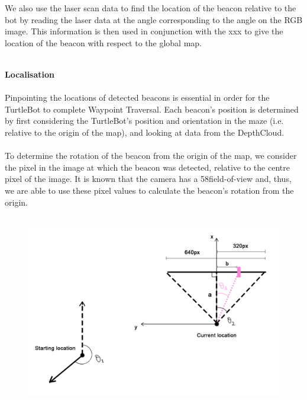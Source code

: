 \documentclass[titlepage,12pt,a4paper]{article}
\begin{document}
\noindent We also use the laser scan data to find the location of the beacon relative to the bot by reading the laser data at the angle corresponding to the angle on the RGB image. This information is then used in conjunction with the xxx to give the location of the beacon with respect to the global map. \\

\pagebreak

\large{\textbf{\\Localisation}} \\
\normalsize
\\
Pinpointing the locations of detected beacons is essential in order for the TurtleBot to complete Waypoint Traversal. Each beacon's position is determined by first considering the TurtleBot's position and orientation in the maze (i.e. relative to the origin of the map), and looking at data from the DepthCloud. \\
\\
To determine the rotation of the beacon from the origin of the map, we consider the pixel in the image at which the beacon was detected, relative to the centre pixel of the image. It is known that the camera has a 58\degree field-of-view and, thus, we are able to use these pixel values to calculate the beacon's rotation from the origin. \\
\\
\begin{figure}[h]
	\includegraphics[scale=0.3]{beacon.jpg}
\end{figure}
\end{document}
